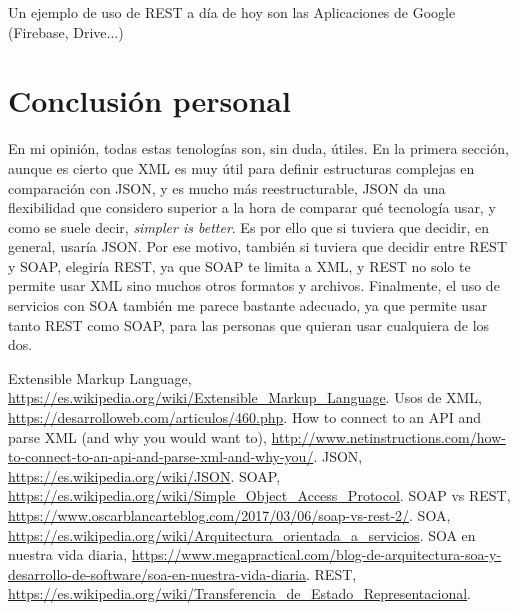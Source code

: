 \documentclass{article}
\begin{document}
Un ejemplo de uso de REST a día de hoy son las Aplicaciones de Google (Firebase, Drive...)

\section{Conclusión personal}
En mi opinión, todas estas tenologías son, sin duda, útiles. En la primera sección, aunque es cierto que XML es muy útil para definir estructuras complejas en comparación con JSON, y es mucho más reestructurable, JSON da una flexibilidad que considero superior a la hora de comparar qué tecnología usar, y como se suele decir, \textit{simpler is better}. Es por ello que si tuviera que decidir, en general, usaría JSON.
Por ese motivo, también si tuviera que decidir entre REST y SOAP, elegiría REST, ya que SOAP te limita a XML, y REST no solo te permite usar XML sino muchos otros formatos y archivos.
Finalmente, el uso de servicios con SOA también me parece bastante adecuado, ya que permite usar tanto REST como SOAP, para las personas que quieran usar cualquiera de los dos.

\begin{thebibliography}{9}
 Extensible Markup Language, \url{https://es.wikipedia.org/wiki/Extensible_Markup_Language}.
 Usos de XML, \url{https://desarrolloweb.com/articulos/460.php}.
 How to connect to an API and parse XML (and why you would want to), \url{http://www.netinstructions.com/how-to-connect-to-an-api-and-parse-xml-and-why-you/}.
 JSON, \url{https://es.wikipedia.org/wiki/JSON}.
 SOAP, \url{https://es.wikipedia.org/wiki/Simple_Object_Access_Protocol}.
 SOAP vs REST, \url{https://www.oscarblancarteblog.com/2017/03/06/soap-vs-rest-2/}.
 SOA, \url{https://es.wikipedia.org/wiki/Arquitectura_orientada_a_servicios}.
 SOA en nuestra vida diaria, \url{https://www.megapractical.com/blog-de-arquitectura-soa-y-desarrollo-de-software/soa-en-nuestra-vida-diaria}.
 REST, \url{https://es.wikipedia.org/wiki/Transferencia_de_Estado_Representacional}.
\end{thebibliography}
\end{document}
